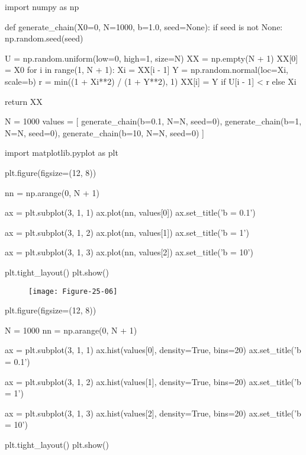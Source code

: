 \begin{python}
import numpy as np

def generate_chain(X0=0, N=1000, b=1.0, seed=None):
    if seed is not None:
        np.random.seed(seed)
        
    U = np.random.uniform(low=0, high=1, size=N)
    XX = np.empty(N + 1)
    XX[0] = X0
    for i in range(1, N + 1):
        Xi = XX[i - 1]
        Y = np.random.normal(loc=Xi, scale=b)
        r = min((1 + Xi**2) / (1 + Y**2), 1)
        XX[i] = Y if U[i - 1] < r else Xi
        
    return XX
\end{python}

\begin{python}
N = 1000
values = [
    generate_chain(b=0.1, N=N, seed=0),
    generate_chain(b=1, N=N, seed=0),
    generate_chain(b=10, N=N, seed=0)
]
\end{python}

\begin{python}
import matplotlib.pyplot as plt

plt.figure(figsize=(12, 8))

nn = np.arange(0, N + 1)

ax = plt.subplot(3, 1, 1)
ax.plot(nn, values[0])
ax.set_title('b = 0.1')

ax = plt.subplot(3, 1, 2)
ax.plot(nn, values[1])
ax.set_title('b = 1')

ax = plt.subplot(3, 1, 3)
ax.plot(nn, values[2])
ax.set_title('b = 10')

plt.tight_layout()
plt.show()
\end{python}

\begin{figure}[H]
\texttt{[image: Figure-25-06]}
\end{figure}

\begin{python}
plt.figure(figsize=(12, 8))

N = 1000
nn = np.arange(0, N + 1)

ax = plt.subplot(3, 1, 1)
ax.hist(values[0], density=True, bins=20)
ax.set_title('b = 0.1')

ax = plt.subplot(3, 1, 2)
ax.hist(values[1], density=True, bins=20)
ax.set_title('b = 1')

ax = plt.subplot(3, 1, 3)
ax.hist(values[2], density=True, bins=20)
ax.set_title('b = 10')

plt.tight_layout()
plt.show()
\end{python}

